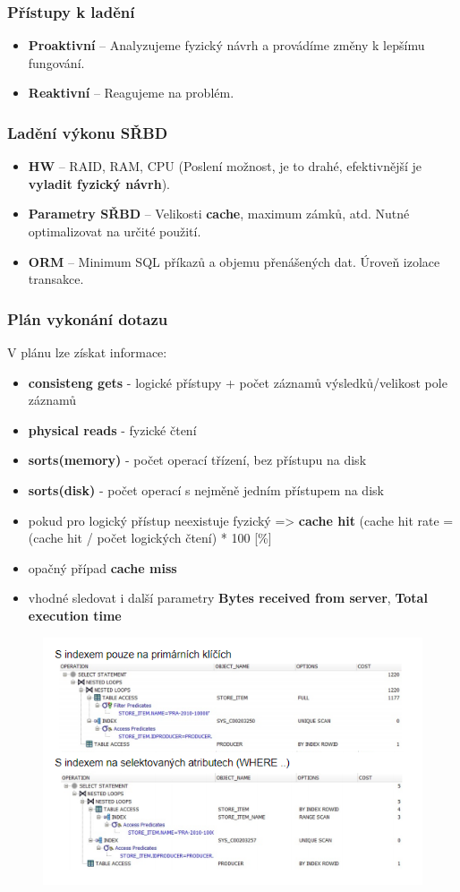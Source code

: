 \subsubsection{Přístupy k ladění}
\begin{itemize}
\item \textbf{Proaktivní} -- Analyzujeme fyzický návrh a provádíme změny k lepšímu fungování.
\item \textbf{Reaktivní} -- Reagujeme na problém.
\end{itemize}

\subsubsection{Ladění výkonu SŘBD}
\begin{itemize}
	\item \textbf{HW} -- RAID, RAM, CPU (Poslení možnost, je to drahé, efektivnější je \textbf{vyladit fyzický návrh}).
	\item \textbf{Parametry SŘBD} -- Velikosti \textbf{cache}, maximum zámků, atd. Nutné optimalizovat na určité použití.
	\item \textbf{ORM} -- Minimum SQL příkazů a objemu přenášených dat. Úroveň izolace transakce.
\end{itemize}

\subsubsection{Plán vykonání dotazu}
V plánu lze získat informace:
\begin{itemize}
	\item \textbf{consisteng gets}  - logické přístupy + počet záznamů výsledků/velikost pole záznamů
	\item \textbf{physical reads} - fyzické čtení
	\item \textbf{sorts(memory)} - počet operací třízení, bez přístupu na disk
	\item \textbf{sorts(disk)} - počet operací s nejměně jedním přístupem na disk
	\item pokud pro logický přístup neexistuje fyzický => \textbf{cache hit} (cache hit rate = (cache hit / počet logických čtení) * 100 [\%]
	\item opačný případ \textbf{cache miss}
	\item vhodné sledovat i další parametry \textbf{Bytes received from server}, \textbf{Total execution time}
\end{itemize}

\begin{figure}[H]
	\includegraphics{assets/plan_vykonani_dotazu_oracle.png}
\end{figure}